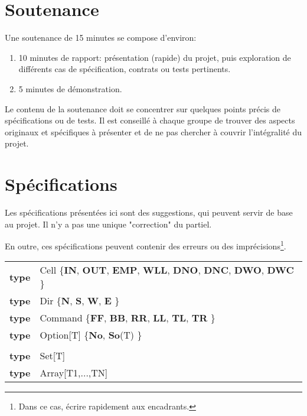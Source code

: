\documentclass{article}
\begin{document}
\section*{Soutenance}

Une soutenance de 15 minutes se compose d'environ:
\begin{enumerate}
\item 10 minutes de rapport: présentation (rapide) du projet, puis
  exploration de différents cas de spécification, contrats ou tests
  pertinents.
\item 5 minutes de démonstration.
\end{enumerate}

Le contenu de la soutenance doit se concentrer sur quelques points
précis de spécifications ou de tests. Il est conseillé à chaque groupe
de trouver des aspects originaux et spécifiques à présenter et de ne
pas chercher à couvrir l'intégralité du projet.

\newpage

\appendix

\section*{Spécifications}

Les spécifications présentées ici sont des suggestions, qui peuvent
servir de base au projet. Il n'y a pas une unique "correction" du partiel.

En outre, ces spécifications peuvent contenir des erreurs ou des
imprécisions\footnote{Dans ce cas, écrire rapidement aux encadrants.}.

\begin{tabular}{rl}
\textbf{type} & \textrm{Cell} \{\textbf{IN}, \textbf{OUT}, \textbf{EMP}, \textbf{WLL}, \textbf{DNO}, \textbf{DNC}, \textbf{DWO}, \textbf{DWC} \} \\
\textbf{type} & \textrm{Dir} \{\textbf{N}, \textbf{S}, \textbf{W}, \textbf{E} \} \\
\textbf{type} & \textrm{Command} \{\textbf{FF}, \textbf{BB}, \textbf{RR}, \textbf{LL}, \textbf{TL}, \textbf{TR} \} \\
\textbf{type} & \textrm{Option[T]} \{\textbf{No}, \textbf{So}(T) \} \\
& \\
\textbf{type} & \textrm{Set[T]}  \\
\textbf{type} & \textrm{Array[T1,...,TN]}  \\
\end{tabular}
\end{document}
